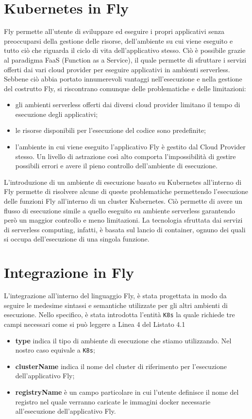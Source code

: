 \section{Kubernetes in Fly}
Fly permette all'utente di sviluppare ed eseguire i propri applicativi senza preoccuparsi della gestione delle risorse, dell'ambiente su cui viene eseguito e tutto ciò che riguarda il ciclo di vita dell'applicativo stesso.
Ciò è possibile grazie al paradigma FaaS (Function as a Service), il quale permette di sfruttare i servizi offerti dai vari cloud provider per eseguire applicativi in ambienti serverless. Sebbene ciò abbia portato innumerevoli vantaggi nell'esecuzione e nella gestione del costrutto Fly, si riscontrano comunque delle problematiche e delle limitazioni:
\begin{itemize}
    \item gli ambienti serverless offerti dai diversi cloud provider limitano il tempo di esecuzione degli applicativi;
    \item le risorse disponibili per l'esecuzione del codice sono predefinite;
    \item l'ambiente in cui viene eseguito l'applicativo Fly è gestito dal Cloud Provider stesso. Un livello di astrazione così alto comporta l'impossibilità di gestire possibili errori e avere il pieno controllo dell'ambiente di esecuzione.
\end{itemize}

L'introduzione di un ambiente di esecuzione basato su Kubernetes all'interno di Fly permette di risolvere alcune di queste problematiche permettendo l'esecuzione delle funzioni Fly all'interno di un cluster Kubernetes. Ciò permette di avere un flusso di esecuzione simile a quello eseguito su ambiente serverless garantendo però un maggior controllo e meno limitazioni. La tecnologia sfruttata dai servizi di serverless computing, infatti, è basata sul lancio di container, ognuno dei quali si occupa dell'esecuzione di una singola funzione.
\section{Integrazione in Fly}
L'integrazione all'interno del linguaggio Fly, è stata progettata in modo da seguire le medesime sintassi e semantiche utilizzate per gli altri ambienti di esecuzione. Nello specifico, è stata introdotta l'entità \verb|K8s| la quale richiede tre campi necessari come si può leggere a Linea 4 del Listato 4.1
\begin{itemize}
    \item\textbf{type} indica il tipo di ambiente di esecuzione che stiamo utilizzando. Nel nostro caso equivale a \verb|K8s|;
    \item\textbf{clusterName} indica il nome del cluster di riferimento per l'esecuzione dell'applicativo Fly;
    \item\textbf{registryName} è un campo particolare in cui l'utente definisce il nome del registro nel quale verranno caricate le immagini docker necessarie all'esecuzione dell'applicativo Fly. 
\end{itemize}

